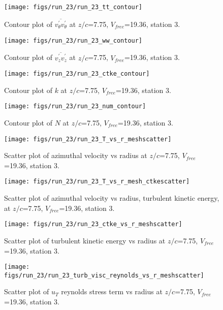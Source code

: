 \begin{figure}[H]
\centering
\texttt{[image: figs/run\_23/run\_23\_tt\_contour]}
\caption{Contour plot of $\overline{v_{\theta}^{\prime} v_{\theta}^{\prime}}$ at $z/c$=7.75, $V_{free}$=19.36, station 3.}
\end{figure}


\begin{figure}[H]
\centering
\texttt{[image: figs/run\_23/run\_23\_ww\_contour]}
\caption{Contour plot of $\overline{v_{z}^{\prime} v_{z}^{\prime}}$ at $z/c$=7.75, $V_{free}$=19.36, station 3.}
\end{figure}


\begin{figure}[H]
\centering
\texttt{[image: figs/run\_23/run\_23\_ctke\_contour]}
\caption{Contour plot of $k$ at $z/c$=7.75, $V_{free}$=19.36, station 3.}
\end{figure}


\begin{figure}[H]
\centering
\texttt{[image: figs/run\_23/run\_23\_num\_contour]}
\caption{Contour plot of $N$ at $z/c$=7.75, $V_{free}$=19.36, station 3.}
\end{figure}


\begin{figure}[H]
\centering
\texttt{[image: figs/run\_23/run\_23\_T\_vs\_r\_meshscatter]}
\caption{Scatter plot of azimuthal velocity vs radius at $z/c$=7.75, $V_{free}$=19.36, station 3.}
\end{figure}


\begin{figure}[H]
\centering
\texttt{[image: figs/run\_23/run\_23\_T\_vs\_r\_mesh\_ctkescatter]}
\caption{Scatter plot of azimuthal velocity vs radius, turbulent kinetic energy, at $z/c$=7.75, $V_{free}$=19.36, station 3.}
\end{figure}


\begin{figure}[H]
\centering
\texttt{[image: figs/run\_23/run\_23\_ctke\_vs\_r\_meshscatter]}
\caption{Scatter plot of turbulent kinetic energy vs radius at $z/c$=7.75, $V_{free}$=19.36, station 3.}
\end{figure}


\begin{figure}[H]
\centering
\texttt{[image: figs/run\_23/run\_23\_turb\_visc\_reynolds\_vs\_r\_meshscatter]}
\caption{Scatter plot of $
u_T$ reynolds stress term vs radius at $z/c$=7.75, $V_{free}$=19.36, station 3.}
\end{figure}


